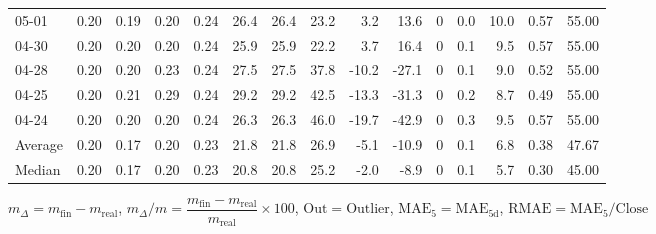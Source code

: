 \begin{threeparttable}
{\begin{tabular}{lrrrrrrrrrrrrrr}
  05-01 &          0.20 &          0.19 &          0.20 &        0.24 &                26.4 &               26.4 &                23.2 &        3.2 &         13.6 &              0 &                 0.0 &             10.0 &            0.57 &                  55.00 \\
  04-30 &          0.20 &          0.20 &          0.20 &        0.24 &                25.9 &               25.9 &                22.2 &        3.7 &         16.4 &              0 &                 0.1 &              9.5 &            0.57 &                  55.00 \\
  04-28 &          0.20 &          0.20 &          0.23 &        0.24 &                27.5 &               27.5 &                37.8 &      -10.2 &        -27.1 &              0 &                 0.1 &              9.0 &            0.52 &                  55.00 \\
  04-25 &          0.20 &          0.21 &          0.29 &        0.24 &                29.2 &               29.2 &                42.5 &      -13.3 &        -31.3 &              0 &                 0.2 &              8.7 &            0.49 &                  55.00 \\
  04-24 &          0.20 &          0.20 &          0.20 &        0.24 &                26.3 &               26.3 &                46.0 &      -19.7 &        -42.9 &              0 &                 0.3 &              9.5 &            0.57 &                  55.00 \\
Average &          0.20 &          0.17 &          0.20 &        0.23 &                21.8 &               21.8 &                26.9 &       -5.1 &        -10.9 &              0 &                 0.1 &              6.8 &            0.38 &                  47.67 \\
 Median &          0.20 &          0.17 &          0.20 &        0.23 &                20.8 &               20.8 &                25.2 &       -2.0 &         -8.9 &              0 &                 0.1 &              5.7 &            0.30 &                  45.00 \\
\bottomrule
\end{tabular}
}
\begin{tablenotes}\footnotesize
\item $m_\Delta=m_{\text{fin}}-m_{\text{real}}$,
$m_\Delta/m=\dfrac{m_{\text{fin}}-m_{\text{real}}}{m_{\text{real}}}\times100$,
$\mathrm{Out}=\text{Outlier}$,
$\mathrm{MAE}_5=\mathrm{MAE}_{5\text{d}}$,
$\mathrm{RMAE}=\mathrm{MAE}_5/\text{Close}$
\end{tablenotes}
\end{threeparttable}
\endgroup

